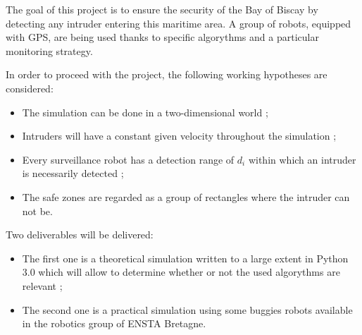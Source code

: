 \bigskip

The goal of this project is to ensure the security of the Bay of Biscay by detecting any intruder entering this maritime area.
A group of robots, equipped with GPS, are being used thanks to specific algorythms and a particular monitoring strategy.

\bigskip

In order to proceed with the project, the following working hypotheses are considered:
\begin{itemize}
\item The simulation can be done in a two-dimensional world ;
\item Intruders will have a constant given velocity throughout the simulation ;
\item Every surveillance robot has a detection range of $d_{i}$ within which an intruder is necessarily detected ;
\item The safe zones are regarded as a group of rectangles where the intruder can not be.
\end{itemize}

\bigskip

Two deliverables will be delivered:
\begin{itemize}
\item The first one is a theoretical simulation written to a large extent in Python 3.0 which will allow to determine whether or not the used algorythms are relevant ;
\item The second one is a practical simulation using some buggies robots available in the robotics group of ENSTA Bretagne.
\end{itemize}

